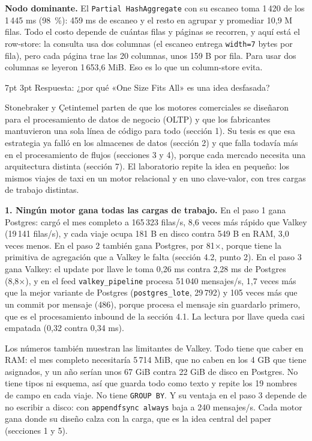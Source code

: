 \documentclass[10pt,letterpaper]{article}
\makeatletter
\renewcommand\section{\@startsection{section}{1}{\z@}%
  {7pt \@plus 2pt \@minus 1pt}{3pt}%
  {\normalfont\normalsize\bfseries\color{acc}}}
\makeatother
\begin{document}
\textbf{Nodo dominante.} El \texttt{Partial HashAggregate} con su escaneo toma 1\,420 de los 1\,445 ms
(98~\%): 459 ms de escaneo y el resto en agrupar y promediar 10,9 M filas. Todo el costo depende de cuántas
filas y páginas se recorren, y aquí está el row-store: la consulta usa dos columnas (el escaneo entrega
\texttt{width=7} bytes por fila), pero cada página trae las 20 columnas, unos 159 B por fila. Para usar
dos columnas se leyeron 1\,653,6 MiB. Eso es lo que un column-store evita.

\clearpage
\section{Respuesta: ¿por qué «One Size Fits All» es una idea desfasada?}

Stonebraker y Çetintemel parten de que los motores comerciales se diseñaron para el procesamiento de
datos de negocio (OLTP) y que los fabricantes mantuvieron una sola línea de código para todo
(sección 1). Su tesis es que esa estrategia ya falló en los almacenes de datos (sección 2) y que falla
todavía más en el procesamiento de flujos (secciones 3 y 4), porque cada mercado necesita una
arquitectura distinta (sección 7). El laboratorio repite la idea en pequeño: los mismos viajes de taxi
en un motor relacional y en uno clave-valor, con tres cargas de trabajo distintas.

\textbf{1. Ningún motor gana todas las cargas de trabajo.} En el paso 1 gana Postgres: cargó el mes
completo a 165\,323 filas/s, 8,6 veces más rápido que Valkey (19\,141 filas/s), y cada viaje ocupa 181 B
en disco contra 549 B en RAM, 3,0 veces menos. En el paso 2 también gana Postgres, por 81×, porque tiene la primitiva de agregación que a Valkey le
falta (sección 4.2, punto 2). En
el paso 3 gana Valkey: el update por llave le toma 0,26 ms contra 2,28 ms de Postgres (8,8×), y en el
feed \texttt{valkey\_pipeline} procesa 51\,040 mensajes/s, 1,7 veces más que la mejor variante de
Postgres (\texttt{postgres\_lote}, 29\,792) y 105 veces más que un commit por mensaje (486), porque procesa
el mensaje sin guardarlo primero, que es el procesamiento inbound de la sección 4.1. La lectura por llave
queda casi empatada (0,32 contra 0,34 ms).

Los números también muestran las limitantes de Valkey. Todo tiene que caber en RAM: el mes completo
necesitaría 5\,714 MiB, que no caben en los 4 GB que tiene asignados, y un año serían unos 67 GiB contra
22 GiB de disco en Postgres. No tiene tipos ni esquema, así que guarda todo como texto y repite los 19
nombres de campo en cada viaje. No tiene \texttt{GROUP BY}. Y su ventaja en el paso 3 depende de no
escribir a disco: con \texttt{appendfsync always} baja a 240 mensajes/s. Cada motor gana donde su diseño
calza con la carga, que es la idea central del paper (secciones 1 y 5).
\end{document}
